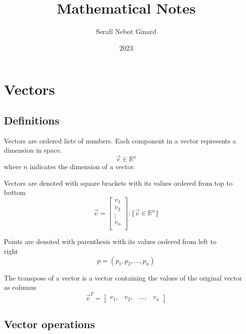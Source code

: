 \documentclass{article}
\title{Mathematical Notes}
\author{Serafí Nebot Ginard}
\date{2023}
\begin{document}
\maketitle
\newpage

\tableofcontents
\newpage

\section{Vectors}
\subsection{Definitions}
Vectors are ordered lists of numbers. Each component in a vector represents a dimension in space.
\[
	\vec{v} \in \mathbb{R}^n
\]
where $n$ indicates the dimension of a vector.

Vectors are denoted with square brackets with its values ordered from top to bottom
\[
	\vec{v} = \begin{bmatrix}
		v_1 \\
		v_2 \\
		\vdots \\
		v_n \\
	\end{bmatrix} \colon \{\vec{v} \in \mathbb{R}^n\}
\]

Points are denoted with parenthesis with its values ordered from left to\\right
\[
	p = \left(p_1, p_2, \dots, p_n \right)
\]

The transpose of a vector is a vector containing the values of the original vector as columns
\[
	\vec{v}^T = \begin{bmatrix}
		v_1, & v_2, & \dots, & v_n
	\end{bmatrix}
\]

\pagebreak
\subsection{Vector operations}
\end{document}
